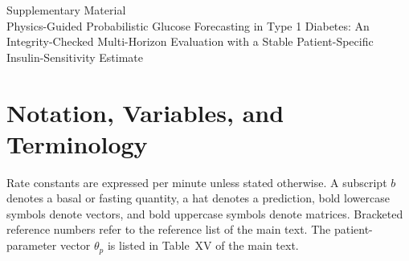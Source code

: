 \documentclass[10pt]{article}
\begin{document}
\begin{center}{\Large Supplementary Material}\\[4pt]
Physics-Guided Probabilistic Glucose Forecasting in Type 1 Diabetes: An Integrity-Checked Multi-Horizon Evaluation with a Stable Patient-Specific Insulin-Sensitivity Estimate\end{center}

\section*{Notation, Variables, and Terminology}
Rate constants are expressed per minute unless stated otherwise. A subscript $b$ denotes a basal or fasting quantity, a hat denotes a prediction, bold lowercase symbols denote vectors, and bold uppercase symbols denote matrices. Bracketed reference numbers refer to the reference list of the main text. The patient-parameter vector $\theta_p$ is listed in Table~XV of the main text.
\end{document}

